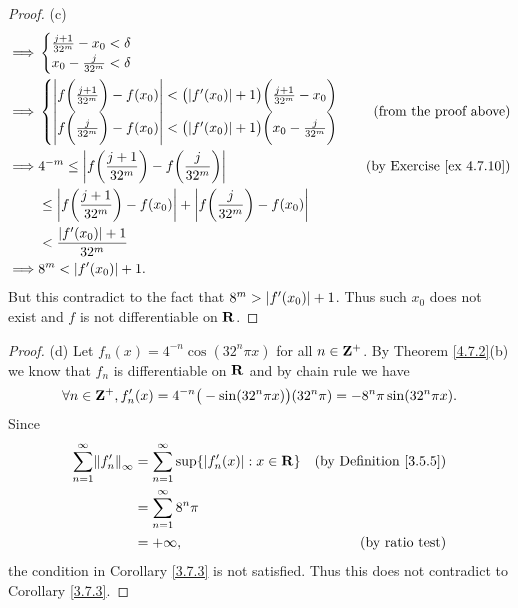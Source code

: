 \begin{proof}{(c)}
\begin{align*}
        \implies & \begin{cases}
                       \frac{j + 1}{32^m} - x_0 < \delta \\
                       x_0 - \frac{j}{32^m} < \delta
                   \end{cases}                                                                                                                                \\
        \implies & \begin{cases}
                       \abs{f\bigg(\frac{j + 1}{32^m}\bigg) - f(x_0)} < \big(\abs{f'(x_0)} + 1\big) \bigg(\frac{j + 1}{32^m} - x_0\bigg) \\
                       \abs{f\bigg(\frac{j}{32^m}\bigg) - f(x_0)} < \big(\abs{f'(x_0)} + 1\big) \bigg(x_0 - \frac{j}{32^m}\bigg)
                   \end{cases} & \text{(from the proof above)}                                           \\
        \implies & 4^{-m} \leq \abs{f\bigg(\frac{j + 1}{32^m}\bigg) - f\bigg(\frac{j}{32^m}\bigg)}                                           & \text{(by Exercise \ref{ex 4.7.10})} \\
                 & \leq \abs{f\bigg(\frac{j + 1}{32^m}\bigg) - f(x_0)} + \abs{f\bigg(\frac{j}{32^m}\bigg) - f(x_0)}                                                                 \\
                 & < \frac{\abs{f'(x_0)} + 1}{32^m}                                                                                                                                 \\
        \implies & 8^m < \abs{f'(x_0)} + 1.
    \end{align*}
    But this contradict to the fact that \(8^m > \left\lvert f'(x_0)\right\rvert + 1\).
    Thus such \(x_0\) does not exist and \(f\) is not differentiable on \(\mathbf{R}\).
\end{proof}

\begin{proof}{(d)}
    Let \(f_n(x) = 4^{-n} \cos(32^n \pi x)\) for all \(n \in \mathbf{Z}^+\).
    By Theorem \ref{4.7.2}(b) we know that \(f_n\) is differentiable on \(\mathbf{R}\) and by chain rule we have
    \[
        \forall n \in \mathbf{Z}^+, f_n'(x) = 4^{-n} \big(-\sin(32^n \pi x)\big) (32^n \pi) = - 8^n \pi \sin(32^n \pi x).
    \]
    Since
    \begin{align*}
        \sum_{n = 1}^\infty \norm*{f_n'}_\infty & = \sum_{n = 1}^\infty \sup\{\abs{f_n'(x)} : x \in \R\} & \text{(by Definition \ref{3.5.5})} \\
                                                & = \sum_{n = 1}^\infty 8^n \pi                                                               \\
                                                & = +\infty,                                             & \text{(by ratio test)}
    \end{align*}
    the condition in Corollary \ref{3.7.3} is not satisfied.
    Thus this does not contradict to Corollary \ref{3.7.3}.
\end{proof}